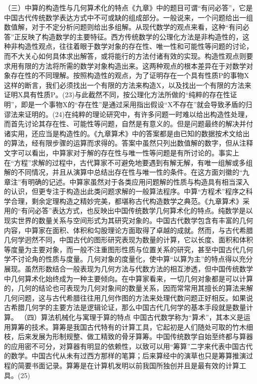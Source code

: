 \documentclass[12pt,UTF8]{ctexbook}
\begin{document}
（三）中算的构造性与几何算术化的特点《九章》中的题目可谓“有问必答”，它是中国古代传统数学表达方式中不可或缺的组成部分。一般说来，一个问题给出一组数值解，对于不定分析问题则给出多组解。从现代数学的观点来看，这种“有问必答”正反映了构造数学的主要特征。西方传统数学的公理化方法是非构造性的，这种非构造性观点，往往着眼于数学对象的存在性、唯一性和可能性等问题的讨论，而不大关心如何具体求出解答，或将能行的方法付诸有效的实现。构造性观点则要求用有限的方法将所需的数学对象构造出来。这两种观点的根本差异在于对数学对象存在性的不同理解。按照构造性的观点，为了证明存在一个具有性质P的事物X这样的断言，我们必须找出一个有限的方法来构造X，以及找出一个有限的方法来证明X具有性质P。(23)与此截然不同，按公理化方法所做的“纯粹的存在性证明”，即是一个事物X的“存在性”是通过采用指出假设“X不存在”就会导致矛盾的归谬法来证明的。(24)在纯粹的理论研究中，有许多问题一时难以给出构造性处理，而首先讨论其存在性、可能性等问题，自然是有意义的。但是问题最终的解决并付诸实用，还应当是构造性的。《九章算术》中的答案都是由已知的数据按术文给出的算法，经有限步骤的运算而求得的。答案中虽然只列出数值解的数字，但从注释文字可以看出，中算家对于解的存在性与唯一性等问题是有所讨论的。事实上在“方程”求解的过程中，古代算家不可避免地要遇到有解无解，有唯一组解或多组解的不同情况，并且从演算中总结出存在性与唯一性的条件。在这方面刘徽的“九章注”有明确的记述。中算家虽然对于各类应用问题解的性质与构造具有相当深入的认识，但更专注于构造出此类问题求解的一般算法程序。中算“方程术”程序之科学合理，剩余定理构造之精妙完美，都堪称古代构造数学之典范。《九章算术》采用的“有问必答”表达方式，也反映出中国传统数学几何算术化的特点。纯数学是以现实世界的数量关系与空间形式为其研究对象的。中国古代数学包含有丰富的几何内容，中算家在面积、体积和勾股理论方面取得了卓越的成就。然而，与古代希腊几何学迥然不同，中国古代的图形研究表现为数量的计算，它以长度、面积和体积等度量为主要对象，而一般不注重图形性质与位置关系的研究，甚至中国古代几何学不讨论角的性质与度量。几何对象的度量化，使中算“以算为主”的特点得以充分展现。虽然形数结合一般表现为几何方法与代数方法的相互渗透，但中国传统数学中几何算术化始终成为一种主要倾向。在中算家看来，一切几何对象都是可以计算的，几何的结论也可表现为几何对象间的数量关系，因而常常用其擅长的算法来解几何问题，这与古代希腊往往用几何作图的方法来处理代数问题正好相反。如果说古希腊几何学的主要方法是逻辑论证，那么中国古代几何学的基本手段就是数量计算。
（四）算法机械化与寓理于算的特点
中国古代数学称为“算术”，其本义是运用算筹的技术。算筹是我国古代特有的计算工具，它起初是人们随处可取的竹木细枝，后来发展为形制规整、做工精致的骨牙算筹。中国传统数学自始至终都与算器的应用密不可分，对算器有明显的依赖性，以致可以用“筹算”二字来代表中国古代的数学。中国古代从未有过西方那样的笔算；后来算经中的演草也只是筹算推演过程的简要书面记录。算筹是在计算机发明以前我国所独创并且是最有效的计算工具。(25)
\end{document}
